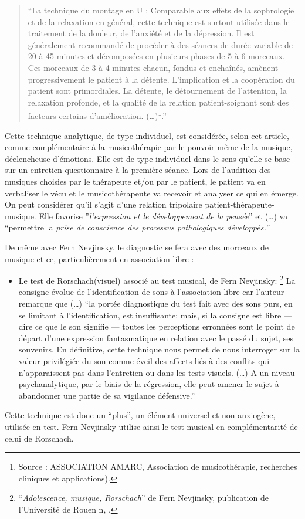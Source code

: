 \begin{quotation}
``La technique du montage en U : Comparable aux effets de la sophrologie
et de la relaxation en général, cette technique est surtout utilisée
dans le traitement de la douleur, de l'anxiété et de
la dépression. Il est généralement recommandé de procéder à des séances
de durée variable de 20 à 45 minutes et décomposées en plusieurs phases
de 5 à 6 morceaux. Ces morceaux de 3 à 4 minutes chacun, fondus et
enchaînés, amènent progressivement le patient à la détente. L'implication
et la coopération du patient sont primordiales. La détente, le détournement
de l'attention, la relaxation profonde, et la qualité
de la relation patient-soignant sont des facteurs certains d'amélioration. (\ldots)\footnote{Source : ASSOCIATION AMARC, Association de musicothérapie, recherches
cliniques et applications).}.''
\end{quotation}

Cette technique analytique, de type individuel, est considérée, selon
cet article, comme complémentaire à la musicothérapie par le pouvoir
même de la musique, déclencheuse d'émotions. Elle est de type individuel
dans le sens qu'elle se base sur un entretien-questionnaire à la première
séance. Lors de l'audition des musiques choisies par le thérapeute
et/ou par le patient, le patient va en verbaliser le vécu et le musicothérapeute
va recevoir et analyser ce qui en émerge. On peut considérer qu'il
s'agit d'une relation tripolaire patient-thérapeute-musique. Elle
favorise ''\emph{l'expression et le développement
de la pensée}'' et (\ldots) va ``permettre la \emph{prise de conscience
des processus pathologiques développés.}''

De même avec Fern Nevjinsky, le diagnostic se fera avec des morceaux
de musique et ce, particulièrement en association libre : 
\begin{itemize} 
\item Le test de Rorschach(visuel) associé au test musical, de Fern Nevjinsky:
\footnote{``\emph{Adolescence, musique, Rorschach}'' de Fern Nevjinsky, publication
de l'Université de Rouen n, \cite{Nevjinsky1996}.} La consigne évolue de l'identification de sons à l'association libre
car l'auteur remarque que (\ldots) ``la portée diagnostique du test
fait avec des sons purs, en se limitant à l'identification, est insuffisante; mais, si la consigne est libre --- dire ce que le son signifie --- toutes
les perceptions erronnées sont le point de départ d'une expression
fantasmatique en relation avec le passé du sujet, ses souvenirs. En
définitive, cette technique nous permet de nous interroger sur la
valeur privilégiée du son comme éveil des affects liés à des conflits
qui n'apparaissent pas dans l'entretien ou dans les tests visuels. 
(\ldots) A un niveau psychanalytique, par le biais de la régression, elle
peut amener le sujet à abandonner une partie de sa vigilance défensive.'' 
\end{itemize}
Cette technique est donc un ``plus'', un élément universel et non
anxiogène, utilisée en test. Fern Nevjinsky utilise ainsi le test
musical en complémentarité de celui de Rorschach.

